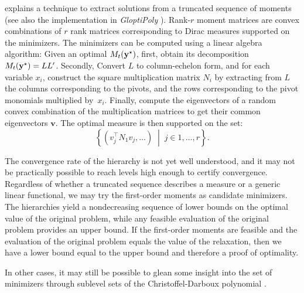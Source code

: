 \textcite[Section 6.7]{Laurent2009} explains a technique to extract solutions from a truncated sequence of moments (see also the implementation in \emph{GloptiPoly} \cite{Henrion2005,henrion2009gloptipoly}). Rank-$r$ moment matrices are convex combinations of $r$ rank matrices corresponding to Dirac measures supported on the minimizers. The minimizers can be computed using a linear algebra algorithm: Given an optimal $M_t(\mathbf{y}^\star)$, first, obtain its decomposition $M_t(\mathbf{y}^\star) = LL'$. Secondly, Convert $L$ to column-echelon form, and for each variable $x_i$, construct the square multiplication matrix $N_i$ by extracting from $L$ the columns corresponding to the pivots, and the rows corresponding to the pivot monomials multiplied by~$x_i$. Finally, compute the eigenvectors of a random convex combination of the multiplication matrices to get their common eigenvectors $\mathbf{v}$. The optimal measure is then supported on the set:
\[\left\{\left(v_j^\top N_1v_j,\dots\right) \;\middle|\; j \in 1,\dots,r \right\}.\]

The convergence rate of the hierarchy is not yet well understood, and it may not be practically possible to reach levels high enough to certify convergence. Regardless of whether a truncated sequence describes a measure or a generic linear functional, we may try the first-order moments as candidate minimizers. The hierarchies yield a nondecreasing sequence of lower bounds on the optimal value of the original problem, while any feasible evaluation of the original problem provides an upper bound. If the first-order moments are feasible and the evaluation of the original problem equals the value of the relaxation, then we have a lower bound equal to the upper bound and therefore a proof of optimality.

In other cases, it may still be possible to glean some insight into the set of minimizers through sublevel sets of the Christoffel-Darboux polynomial \cite{Marx2021:christoffel,lasserre22:christoffel}.